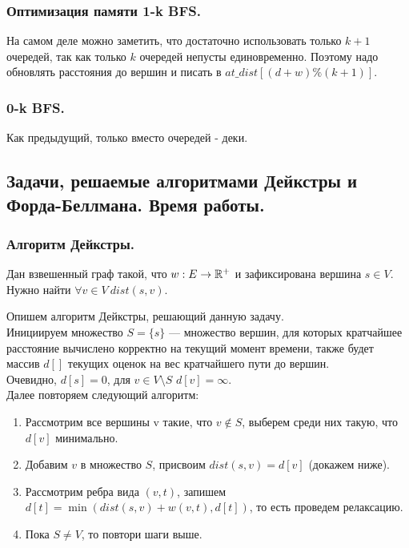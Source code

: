 \documentclass[a4paper,14pt]{article}
\begin{document}
    \subsubsection*{Оптимизация памяти 1-k BFS.}
    На самом деле можно заметить, что
достаточно использовать только $k + 1$ очередей, так как только $k$
очередей непусты единовременно. Поэтому надо обновлять расстояния
до вершин и писать в $at\_dist[(d + w) \%(k + 1)]$.

    \subsubsection*{0-k BFS.}
    Как предыдущий, только вместо очередей - деки.

    \subsection{Задачи, решаемые алгоритмами Дейкстры и Форда-Беллмана. Время работы.}
    
    \subsubsection*{Алгоритм Дейкстры.}
    \label{subsubsec:decstra}
    \begin{problem}
        Дан взвешенный граф такой, что $w: E\rightarrow \mathbb{R}^+$ и зафиксирована вершина $s \in V$. Нужно найти $\forall v \in V \ dist(s,v)$.
    \end{problem}

        Опишем алгоритм Дейкстры, решающий данную задачу. \\
    Инициируем множество $S = \{s\}$ — множество вершин, для которых
    кратчайшее расстояние вычислено корректно на текущий момент
    времени, также будет массив $d[]$ текущих оценок на вес
    кратчайшего пути до вершин.\\
    Очевидно, $d[s] = 0$, для $v \in V \setminus S$  $d[v] = \infty$. \\
    Далее повторяем следующий алгоритм:
    \begin{enumerate}
        \item Рассмотрим все вершины v такие, что $v \notin S$, выберем среди
        них такую, что $d[v]$ минимально.
        \item Добавим $v$ в множество $S$, присвоим $dist(s,v) = d[v]$ (докажем
        ниже).
        \item Рассмотрим ребра вида $(v,t)$, запишем
        $d[t] = \min(dist(s,v)+w(v,t),d[t])$, то есть проведем релаксацию.
        \item Пока $S \neq V$, то повтори шаги выше.
    \end{enumerate}
\end{document}
